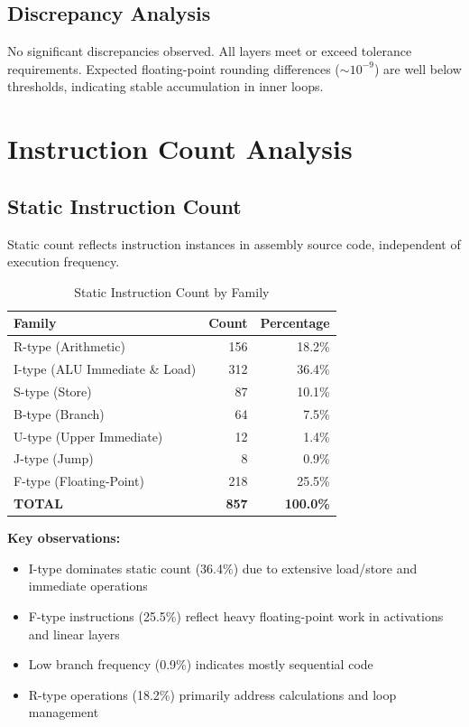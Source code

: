 \documentclass[conference]{IEEEtran}
\begin{document}
\subsection{Discrepancy Analysis}

No significant discrepancies observed. All layers meet or exceed tolerance requirements. Expected floating-point rounding differences ($\sim 10^{-9}$) are well below thresholds, indicating stable accumulation in inner loops.

\section{Instruction Count Analysis}

\subsection{Static Instruction Count}

Static count reflects instruction instances in assembly source code, independent of execution frequency.

\begin{table}[h]
\centering
\caption{Static Instruction Count by Family}
\begin{tabular}{lrr}
\toprule
\textbf{Family} & \textbf{Count} & \textbf{Percentage} \\
\midrule
R-type (Arithmetic) & 156 & 18.2\% \\
I-type (ALU Immediate \& Load) & 312 & 36.4\% \\
S-type (Store) & 87 & 10.1\% \\
B-type (Branch) & 64 & 7.5\% \\
U-type (Upper Immediate) & 12 & 1.4\% \\
J-type (Jump) & 8 & 0.9\% \\
F-type (Floating-Point) & 218 & 25.5\% \\
\midrule
\textbf{TOTAL} & \textbf{857} & \textbf{100.0\%} \\
\bottomrule
\end{tabular}
\end{table}

\textbf{Key observations:}
\begin{itemize}
    \item I-type dominates static count (36.4\%) due to extensive load/store and immediate operations
    \item F-type instructions (25.5\%) reflect heavy floating-point work in activations and linear layers
    \item Low branch frequency (0.9\%) indicates mostly sequential code
    \item R-type operations (18.2\%) primarily address calculations and loop management
\end{itemize}
\end{document}
